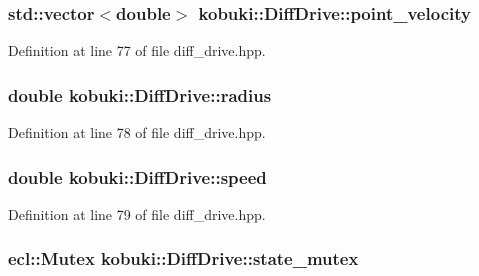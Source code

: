 \subsubsection[{point\-\_\-velocity}]{\setlength{\rightskip}{0pt plus 5cm}std\-::vector$<$double$>$ {\bf kobuki\-::\-Diff\-Drive\-::point\-\_\-velocity}\hspace{0.3cm}{\ttfamily  [private]}}\label{classkobuki_1_1DiffDrive_ac02cea6f6f4e072326be6df76b5b3adb}


\-Definition at line 77 of file diff\-\_\-drive.\-hpp.

\subsubsection[{radius}]{\setlength{\rightskip}{0pt plus 5cm}double {\bf kobuki\-::\-Diff\-Drive\-::radius}\hspace{0.3cm}{\ttfamily  [private]}}\label{classkobuki_1_1DiffDrive_ad2507b8a204c5e8e02c25f40c1787eff}


\-Definition at line 78 of file diff\-\_\-drive.\-hpp.

\subsubsection[{speed}]{\setlength{\rightskip}{0pt plus 5cm}double {\bf kobuki\-::\-Diff\-Drive\-::speed}\hspace{0.3cm}{\ttfamily  [private]}}\label{classkobuki_1_1DiffDrive_ab035b44a28ff971feb1e8806c8ccca59}


\-Definition at line 79 of file diff\-\_\-drive.\-hpp.

\subsubsection[{state\-\_\-mutex}]{\setlength{\rightskip}{0pt plus 5cm}ecl\-::\-Mutex {\bf kobuki\-::\-Diff\-Drive\-::state\-\_\-mutex}\hspace{0.3cm}{\ttfamily  [private]}}\label{classkobuki_1_1DiffDrive_a986e84bef0c53fb84096b2c36594f05e}


